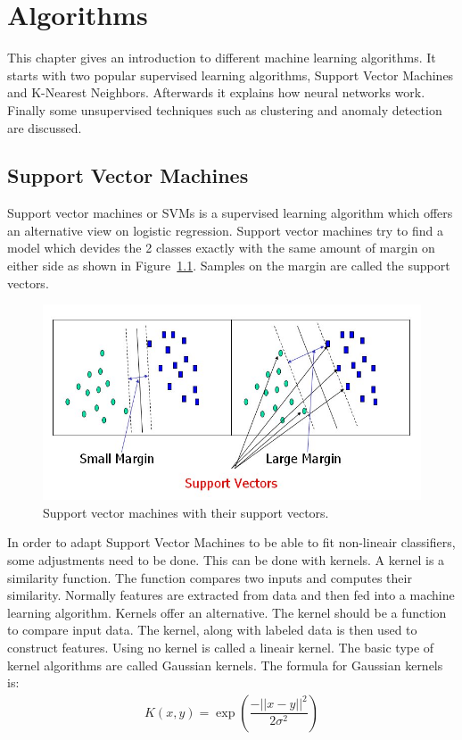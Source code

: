 \chapter{Algorithms}
This chapter gives an introduction to different machine learning algorithms. It starts with two popular supervised learning algorithms, Support Vector Machines and K-Nearest Neighbors. Afterwards it explains how neural networks work. Finally some unsupervised techniques such as clustering and anomaly detection are discussed. 

\section{Support Vector Machines}
Support vector machines or SVMs is a supervised learning algorithm which offers an alternative view on logistic regression. Support vector machines try to find a model which devides the 2 classes exactly with the same amount of margin on either side as shown in Figure~\ref{fig:svm}. Samples on the margin are called the support vectors.
\begin{figure}[H]
\centering
\includegraphics[width=\textwidth]{Figures/svm}
\decoRule
\caption[Support Vector Machines]{Support vector machines with their support vectors. \cite{svm}}
\label{fig:svm}
\end{figure}
\noindent In order to adapt Support Vector Machines to be able to fit non-lineair classifiers, some adjustments need to be done. This can be done with kernels. A kernel is a similarity function. The function compares two inputs and computes their similarity. Normally features are extracted from data and then fed into a machine learning algorithm. Kernels offer an alternative. The kernel should be a function to compare input data. The kernel, along with labeled data is then used to construct features. Using no kernel is called a lineair kernel. The basic type of kernel algorithms are called Gaussian kernels. The formula for Gaussian kernels is:
\begin{align}
K(x,y) = \exp{(\dfrac{-||x-y||^2}{2\sigma^2})}
\end{align}

